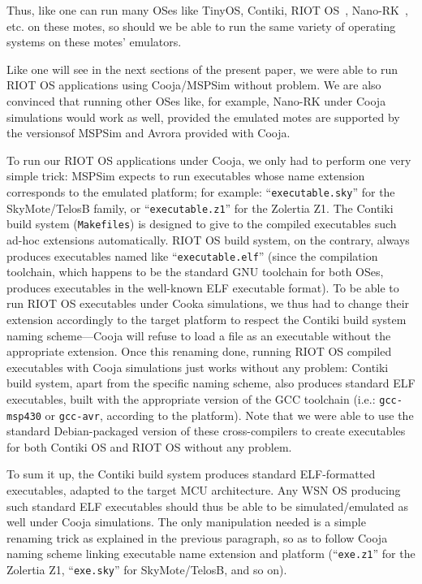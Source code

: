 \documentclass[10pt,emptycopyrightspace]{ewsn-proc}
\begin{document}
Thus, like one can run many OSes like TinyOS, Contiki, RIOT OS~\cite{RIOT},
Nano-RK~\cite{NanoRK}, etc. on these motes, so should we be able to run
the same variety of operating systems on these motes' emulators.

Like one will see in the next sections of the present paper, we were
able to run RIOT OS applications using Cooja/MSPSim without problem.
We are also convinced that running other OSes like, for example,
Nano-RK under Cooja simulations would work as well, provided
the emulated motes are supported by the versionsof MSPSim
and Avrora provided with Cooja.

\smallskip

To run our RIOT OS applications under Cooja, we only had to perform one
very simple trick: MSPSim expects to run executables whose name extension
corresponds to the emulated platform; for example:
``\texttt{executable.sky}'' for the SkyMote/TelosB family, or
``\texttt{executable.z1}'' for the Zolertia Z1. The Contiki build system
(\texttt{Makefiles}) is designed to give to the compiled executables
such ad-hoc extensions automatically. RIOT OS build system, on the
contrary, always produces executables named like ``\texttt{executable.elf}''
(since the compilation toolchain, which happens to be the standard GNU
toolchain for both OSes, produces executables in the well-known ELF
executable format). To be able to run RIOT OS executables under Cooka
simulations, we thus had to change their extension accordingly to the
target platform to respect the Contiki build system naming scheme---Cooja
will refuse to load a file as an executable without the appropriate
extension. Once this renaming done, running RIOT OS compiled executables
with Cooja simulations just works without any problem: Contiki build
system, apart from the specific naming scheme, also produces standard
ELF executables, built with the appropriate version of the GCC toolchain
(i.e.: \texttt{gcc-msp430} or \texttt{gcc-avr}, according to the platform).
Note that we were able to use the standard Debian-packaged version of
these cross-compilers to create executables for both Contiki OS and
RIOT OS without any problem.

\medskip

To sum it up, the Contiki build system produces standard ELF-formatted
executables, adapted to the target MCU architecture. Any WSN OS producing
such standard ELF executables should thus be able to be simulated/emulated
as well under Cooja simulations. The only manipulation needed is a simple
renaming trick as explained in the previous paragraph, so as to follow
Cooja naming scheme linking executable name extension and platform
(``\texttt{exe.z1}'' for the Zolertia Z1, ``\texttt{exe.sky}'' for
SkyMote/TelosB, and so on).
\end{document}
